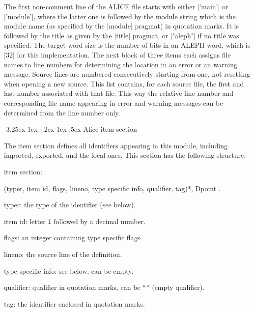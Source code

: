 \documentclass[titlepage]{article}
\makeatletter
\newcommand\A{\textsf{ALEPH}}
\newcommand\I{\textsf{ALICE}}
\newenvironment{grammar}{%
\begin{list}{}{%
\setlength\leftmargin{18pt}%
\setlength\rightmargin{-5pt}%
\setlength\listparindent{20pt}%
\setlength\itemsep{1pt plus0.2ex}%
\setlength\parsep{0pt plus 2pt}%
\setlength\labelsep{-5pt}%
}\color{blue!90!black}\sf\mkoptions%
}{\end{list}}
\newcommand\g[1]{\textsf{\color{blue!90!black}#1}}
\def\remark#1{{\normalfont #1}}
\renewcommand\subsection{%
\@startsection{subsection}{2}{\z@}%
   {-3.25ex\@plus -1ex \@minus -.2ex}%
   {1ex \@plus .5ex}%
   {\normalfont\normalsize\bfseries}}
\makeatother
\begin{document}
\noindent
The first non-comment line of the \I{} file starts with either \pp|'main'|
or \pp|'module'|, where the latter one is followed by the \g{module string}
which is the module name (as specified by the \pp|module| pragmat) in
quotation marks. It is followed by the title as given by the \pp|title|
pragmat, or \pp|"aleph"| if no title was specified. The target word size is the
number of bits in an \A{} word, which is \pp|32| for this implementation. The
next block of three items each assigns file names to line numbers for
determining the 
location in an error or an warning message. Source lines are numbered consecutively
starting from one, not resetting when opening a new source. This list
contains, for each source file, the first and last number associated with
that file. This way the 
relative line number and corresponding file name appearing in error and
warning messages can be determined from the line number only.

\subsection{Alice item section}\label{alice:item}

The \g{item section} defines all identifiers appearing in this module,
including imported, exported, and the local ones. This section has the
following structure:
\begin{grammar}
\item item section: 

  (typer, item id, flags, lineno, type specific info, qualifier, tag)*, Dpoint .
\item typer: \remark{the type of the identifier (see below)}.
\item item id: \remark{letter {\tt I} followed by a decimal number}.
\item flags: \remark{an integer containing type specific flags}.
\item lineno: \remark{the source line of the definition}.
\item type specific info: \remark{see below, can be empty}.
\item qualifier: \remark{qualifier in quotation marks, can be {\tt""} (empty
qualifier)}.
\item tag: \remark{the identifier enclosed in quotation marks}.
\end{grammar}
\end{document}
